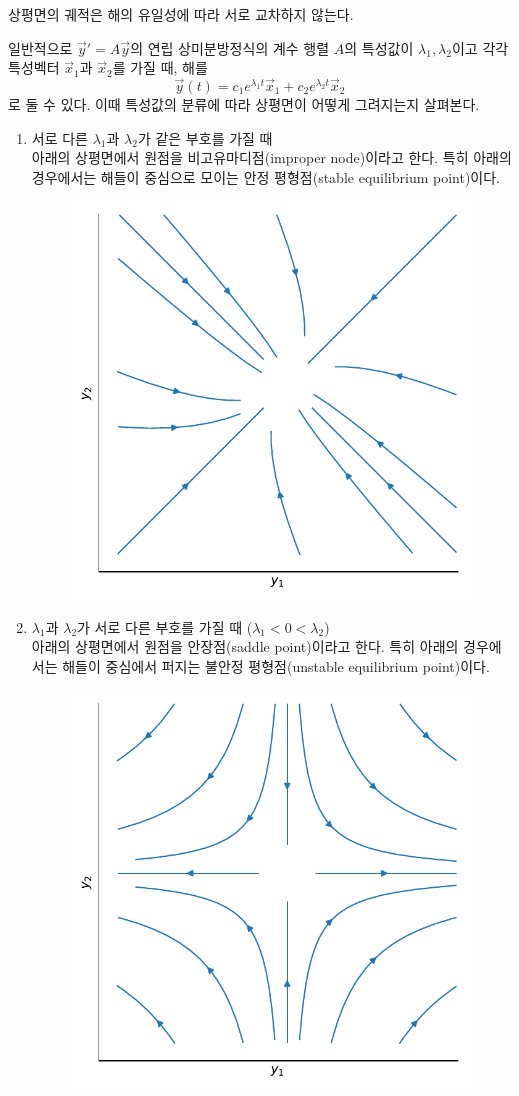 \documentclass[../engineering_mathematics_lecture_note.tex]{subfiles}
\begin{document}
상평면의 궤적은 해의 유일성에 따라 서로 교차하지 않는다.

일반적으로 $\vec y' = A \vec y$의 연립 상미분방정식의 계수 행렬 $A$의 특성값이 $\lambda_1, \lambda_2$이고 각각 특성벡터 $\vec x_1$과 $\vec x_2$를 가질 때, 해를
\begin{equation*}
    \vec y(t) = c_1 e^{\lambda_1 t} \vec x_1 + c_2 e^{\lambda_2 t} \vec x_2
\end{equation*}
로 둘 수 있다.
이때 특성값의 분류에 따라 상평면이 어떻게 그려지는지 살펴본다.
\begin{enumerate}
    \item 서로 다른 $\lambda_1$과 $\lambda_2$가 같은 부호를 가질 때\\
        아래의 상평면에서 원점을 비고유마디점(improper node)이라고 한다.
        특히 아래의 경우에서는 해들이 중심으로 모이는 안정 평형점(stable equilibrium point)이다.
        \begin{figure}[H]
            \centering
            \includegraphics[width=0.5\linewidth]{plots/improper_node.pdf}
            \label{fig:plots/improper_node.pdf}
        \end{figure}
    \item $\lambda_1$과 $\lambda_2$가 서로 다른 부호를 가질 때 ($\lambda_1 < 0 < \lambda_2$)\\
        아래의 상평면에서 원점을 안장점(saddle point)이라고 한다.
        특히 아래의 경우에서는 해들이 중심에서 퍼지는 불안정 평형점(unstable equilibrium point)이다.
        \begin{figure}[H]
            \centering
            \includegraphics[width=0.5\linewidth]{plots/saddle_point.pdf}

\end{figure}
\end{enumerate}
\end{document}

